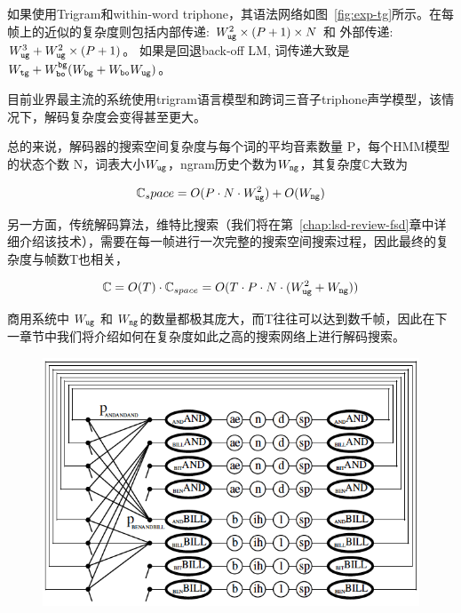 如果使用Trigram和within-word triphone，其语法网络如图~\ref{fig:exp-tg}所示。在每帧上的近似的复杂度则包括内部传递: $W_{\tt ug}^2\times (P+1)\times N$ 和 外部传递: $W_{\tt ug}^3 + W_{\tt ug}^2\times (P+1)$。
如果是回退back-off LM, 词传递大致是$W_{\tt tg}+W_{\tt bo}^{\tt bg}(W_{\tt bg}+W_{\tt bo}W_{\tt ug}) $。

目前业界最主流的系统使用trigram语言模型和跨词三音子triphone声学模型，该情况下，解码复杂度会变得甚至更大。

总的来说，解码器的搜索空间复杂度与每个词的平均音素数量 P，每个HMM模型的状态个数 N，词表大小$W_{\tt ug}$，ngram历史个数为$W_{\tt ng}$，其复杂度$\mathbb{C}$大致为

\begin{equation}
\label{equ:dec-cmp-space}
 \begin{split}
\mathbb{C}_space = O(P\cdot N \cdot W_{\tt ug}^2)+O(W_{\tt ng})
 \end{split}
\end{equation}

另一方面，传统解码算法，维特比搜索（我们将在第~\ref{chap:lsd-review-fsd}章中详细介绍该技术），需要在每一帧进行一次完整的搜索空间搜索过程，因此最终的复杂度与帧数T也相关，


\begin{equation}
\label{equ:dec-cmp-space}
 \begin{split}
\mathbb{C} = O(T)\cdot \mathbb{C}_{space} = O(T\cdot P\cdot N \cdot (W_{\tt ug}^2+W_{\tt ng}))
 \end{split}
\end{equation}

商用系统中 $W_{\tt ug}$ 和 $W_{\tt ng}$的数量都极其庞大，而T往往可以达到数千帧，因此在下一章节中我们将介绍如何在复杂度如此之高的搜索网络上进行解码搜索。

\begin{figure}[!htp]
  \centering
    \captionstyle{\centering}
    \includegraphics[clip=true, width=\textwidth]{figure/tg.png}
\end{figure}

